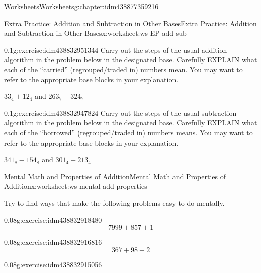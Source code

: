 \documentclass[twoside,11pt,]{book}
\begin{document}
\begin{chapterptx}{Worksheets}{}{Worksheets}{}{}{g:chapter:idm438877359216}
\begin{worksheet-section-numberless}{Extra Practice: Addition and Subtraction in Other Bases}{}{Extra Practice: Addition and Subtraction in Other Bases}{}{}{x:worksheet:ws-EP-add-sub}
\begin{divisionexercise}{1}{}{0.1}{g:exercise:idm438832951344}%
Carry out the steps of the usual addition algorithm in the problem below in the designated base.  Carefully EXPLAIN what each of the “carried” (regrouped\slash{}traded in) numbers mean.  You may want to refer to the appropriate base blocks in your explanation.%
\par
\(33_4+12_4\) and \(263_7+324_7\)%
\end{divisionexercise}%
\begin{divisionexercise}{2}{}{0.1}{g:exercise:idm438832947824}%
Carry out the steps of the usual subtraction algorithm in the problem below in the designated base.  Carefully EXPLAIN what each of the “borrowed” (regrouped\slash{}traded in) numbers means.  You may want to refer to the appropriate base blocks in your explanation.%
\par
\(341_8 - 154_8 \) and \(301_4 -213_4\)%
\end{divisionexercise}%
\end{worksheet-section-numberless}
\restoregeometry
%
%
\typeout{************************************************}
\typeout{************************************************}
%
\begin{worksheet-section-numberless}{Mental Math and Properties of Addition}{}{Mental Math and Properties of Addition}{}{}{x:worksheet:ws-mental-add-properties}
\begin{introduction}{}%
Try to find ways that make the following problems easy to do mentally.%
\end{introduction}%
\begin{divisionexercise}{1}{}{0.08}{g:exercise:idm438832918480}%
%
\begin{equation*}
7999+857+1
\end{equation*}
%
\end{divisionexercise}%
\begin{divisionexercise}{2}{}{0.08}{g:exercise:idm438832916816}%
%
\begin{equation*}
367+98+2
\end{equation*}
%
\end{divisionexercise}%
\begin{divisionexercise}{3}{}{0.08}{g:exercise:idm438832915056}%

\end{divisionexercise}
\end{worksheet-section-numberless}
\end{chapterptx}
\end{document}
